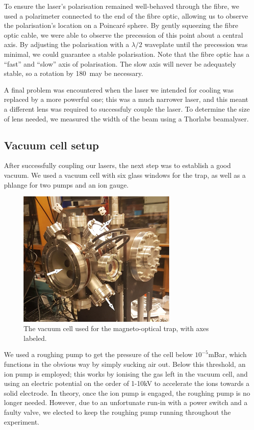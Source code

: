 \documentclass[11pt,twoside,a4paper]{article}
\begin{document}
To ensure the laser's polarisation remained well-behaved through the fibre, we used a polarimeter connected to the end of the fibre optic, allowing us to observe the polarisation's
location on a Poincaré sphere. By gently squeezing the fibre optic cable, we were able to observe the precession of this point about a central axis. By adjusting the polarisation with a \(\lambda/2\)
waveplate until the precession was minimal, we could guarantee a stable polarisation. Note that the fibre optic has a ``fast'' and ``slow'' axis of polarisation. The slow axis will never be adequately
stable, so a rotation by 180\degree~may be necessary.

A final problem was encountered when the laser we intended for cooling was replaced by a more powerful one; this was a much narrower laser, and this meant a different lens was required to successfuly
couple the laser. To determine the size of lens needed, we measured the width of the beam using a Thorlabs beamalyser.
\subsection{Vacuum cell setup}
After successfully coupling our lasers, the next step was to establish a good vacuum. We used a vacuum cell with six glass windows for the trap, as well as a phlange for two pumps and an ion gauge.
\begin{figure}[h]
    \centering
    \includegraphics[width=0.7\textwidth]{images/mot}
    \caption{The vacuum cell used for the magneto-optical trap, with axes labeled.}
\end{figure}

We used a roughing pump to get the pressure of the cell below \(10^{-5}\)mBar, which functions in the obvious way by simply sucking air out. Below this threshold, an ion pump is employed; this works by
ionising the gas left in the vacuum cell, and using an electric potential on the order of 1-10kV to accelerate the ions towards a solid electrode. In theory, once the ion pump is engaged, the roughing
pump is no longer needed. However, due to an unfortunate run-in with a power switch and a faulty valve, we elected to keep the roughing pump running throughout the experiment.
\end{document}
